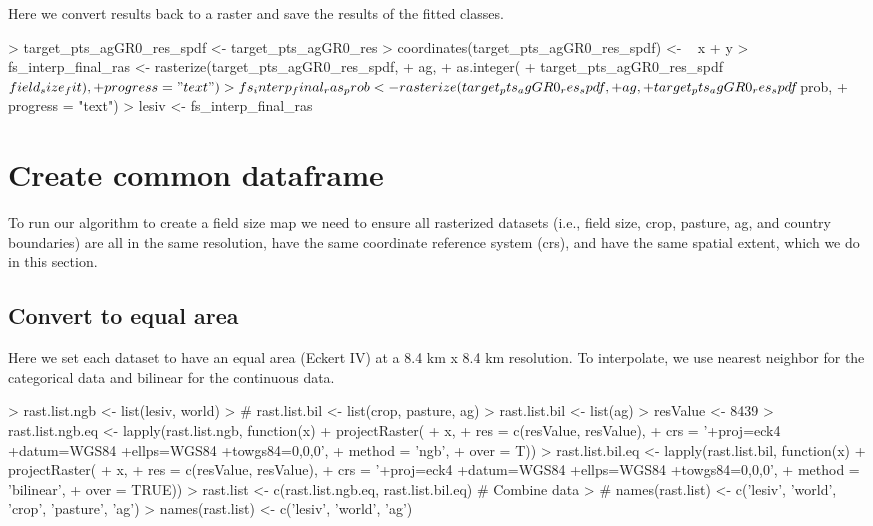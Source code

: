\documentclass{article}
\begin{document}
Here we convert results back to a raster and save the results of the fitted classes.

\begin{Schunk}
\begin{Sinput}
> target_pts_agGR0_res_spdf <- target_pts_agGR0_res
> coordinates(target_pts_agGR0_res_spdf) <- ~ x + y
> fs_interp_final_ras <- rasterize(target_pts_agGR0_res_spdf,
+                                  ag,
+                                  as.integer(
+                                  target_pts_agGR0_res_spdf$field_size_fit),
+                                  progress = "text")
> fs_interp_final_ras_prob <- rasterize(target_pts_agGR0_res_spdf,
+                                       ag,
+                                       target_pts_agGR0_res_spdf$prob,
+                                       progress = "text")
> lesiv <- fs_interp_final_ras
\end{Sinput}
\end{Schunk}


\section{Create common dataframe}

To run our algorithm to create a field size map we need to ensure all rasterized datasets (i.e., field size, crop, pasture, ag, and country boundaries) are all in the same resolution, have the same coordinate reference system (crs), and have the same spatial extent, which we do in this section.

\subsection{Convert to equal area}

Here we set each dataset to have an equal area (Eckert IV) at a 8.4 km x 8.4 km resolution. To interpolate, we use nearest neighbor for the categorical data and bilinear for the continuous data.

\begin{Schunk}
\begin{Sinput}
> rast.list.ngb <- list(lesiv, world)
> # rast.list.bil <- list(crop, pasture, ag)
> rast.list.bil <- list(ag)
> resValue <- 8439
> rast.list.ngb.eq <- lapply(rast.list.ngb, function(x)
+   projectRaster(
+     x,
+     res    = c(resValue, resValue),
+     crs    = '+proj=eck4 +datum=WGS84 +ellps=WGS84 +towgs84=0,0,0',
+     method = 'ngb',
+     over   = T))
> rast.list.bil.eq <- lapply(rast.list.bil, function(x)
+   projectRaster(
+     x,
+     res    = c(resValue, resValue),
+     crs    = '+proj=eck4 +datum=WGS84 +ellps=WGS84 +towgs84=0,0,0',
+     method = 'bilinear',
+     over   = TRUE))
> rast.list <- c(rast.list.ngb.eq, rast.list.bil.eq)  # Combine data
> # names(rast.list) <- c('lesiv', 'world', 'crop', 'pasture', 'ag')
> names(rast.list) <- c('lesiv', 'world', 'ag')
\end{Sinput}
\end{Schunk}
\end{document}
